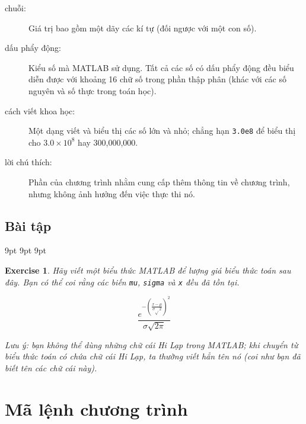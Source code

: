 \documentclass[12pt]{book}
\begin{document}
\begin{description}
\item[chuỗi:] Giá trị bao gồm một dãy các kí tự (đối ngược với một con số).

\item[dấu phẩy động:] Kiểu số mà MATLAB sử dụng. Tất cả các số có
dấu phẩy động đều biểu diễn được với khoảng 16 chữ số trong phần 
thập phân (khác với các số nguyên và số thực trong toán học).

\item[cách viết khoa học:] Một dạng viết và biểu thị các số lớn và nhỏ;
chẳng hạn {\tt 3.0e8} để biểu thị cho $3.0 \times 10^8$
hay 300,000,000.  

\item[lời chú thích:] Phần của chương trình nhằm cung cấp thêm thông tin
về chương trình, nhưng không ảnh hưởng đến việc thực thi nó.

\end{description}


\section{Bài tập}

     {9pt}%
     {9pt}%
     {\itshape}%
     {}%
     {\bfseries}%
     {}%
     {9pt}%
     {}%


\theoremstyle{myex}
\newtheorem{ex}{Exercise}[chapter]

\begin{ex}
Hãy viết một biểu thức MATLAB để lượng giá biểu thức toán sau đây.
Bạn có thể coi rằng các biến {\tt mu}, {\tt sigma} và {\tt x} đều đã tồn tại.

\begin{equation}
\frac{e^{- \left( \frac{x-\mu}{\sigma \sqrt{}2} \right) ^2}}
{\sigma \sqrt{2 \pi}}
\end{equation}

Lưu ý: bạn không thể dùng những chữ cái Hi Lạp trong MATLAB; khi
chuyển từ biểu thức toán có chứa chữ cái Hi Lạp, ta thường viết hẳn 
tên nó (coi như bạn đã biết tên các chữ cái này).
\end{ex}
 

\chapter{Mã lệnh chương trình}
\end{document}
